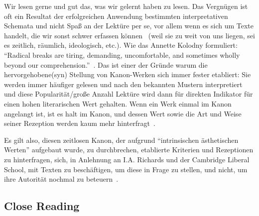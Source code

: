 Wir lesen gerne und gut das, was wir gelernt haben zu lesen.
Das Vergnügen ist oft ein Resultat der erfolgreichen Anwendung bestimmten interpretativen Schemata und nicht Spaß an der Lektüre per se, vor allem wenn es sich um Texte handelt, die wir sonst schwer erfassen können~\cite{Kolodny1980} (weil sie zu weit von uns liegen, sei es zeitlich, räumlich, ideologisch, etc.).
Wie das Annette Kolodny formuliert:
``Radical breaks are tiring, demanding, uncomfortable, and sometimes wholly beyond our comprehension.''~\cite{Kolodny1980}.
Das ist einer der Gründe warum die hervorgehobene(syn) Stellung von Kanon-Werken sich immer fester etabliert:
Sie werden immer häufiger gelesen und nach den bekannten Mustern interpretiert und diese Popularität/große Anzahl Lektüre wird dann für direkten Indikator für einen hohen literarischen Wert gehalten.
Wenn ein Werk einmal im Kanon angelangt ist, ist es halt im Kanon, und dessen Wert sowie die Art und Weise seiner Rezeption werden kaum mehr hinterfragt~\cite{Kolodny1980}.

Es gilt also, diesen zeitlosen Kanon, der aufgrund ``intrinsischen ästhetischen Werten'' aufgebaut wurde, zu durchbrechen, etablierte Kriterien und Rezeptionen zu hinterfragen, %
sich, in Anlehnung an I.A. Richards und der Cambridge Liberal School, mit Texten zu beschäftigen, um diese in Frage zu stellen, und nicht, um ihre Autorität nochmal zu beteuern~\cite{North2013}.


\subsection{Close Reading}

